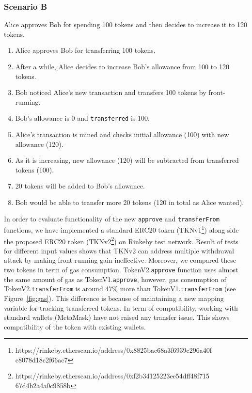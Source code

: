 \subsubsection*{Scenario B} Alice approves Bob for spending 100 tokens and then decides to increase it to 120 tokens.
\begin{enumerate}
	\item Alice approves Bob for transferring 100 tokens.
	\item After a while, Alice decides to increase Bob’s allowance from 100 to 120 tokens.
	\item Bob noticed Alice’s new transaction and transfers 100 tokens by front-running.
	\item Bob’s allowance is 0 and \texttt{transferred} is 100.
	\item Alice’s transaction is mined and checks initial allowance (100) with new allowance (120).
	\item As it is increasing, new allowance (120) will be subtracted from transferred tokens (100).
	\item 20 tokens will be added to Bob’s allowance.
	\item Bob would be able to transfer more 20 tokens (120 in total as Alice wanted).\newline
\end{enumerate}

In order to evaluate functionality of the new \texttt{approve} and \texttt{transferFrom} functions, we have implemented a standard ERC20 token (TKNv1\footnote{https://rinkeby.etherscan.io/address/0x8825bac68a3f6939c296a40f c8078d18c2f66ac7}) along side the proposed ERC20 token (TKNv2\footnote{https://rinkeby.etherscan.io/address/0xf2b34125223ee54dff48f715 67d4b2a4a0c9858b}) on Rinkeby test network. Result of tests for different input values shows that TKNv2 can address multiple withdrawal attack by making front-running gain ineffective. Moreover, we compared these two tokens in term of gas consumption. TokenV2.\texttt{approve} function uses almost the same amount of gas as TokenV1.\texttt{approve}, however, gas consumption of TokenV2.\texttt{transferFrom} is around 47\% more than TokenV1.\texttt{transferFrom} (see Figure~\ref{fig:gas}). This difference is because of maintaining a new mapping variable for tracking transferred tokens. In term of compatibility, working with standard wallets (\eg MetaMask) have not raised any transfer issue. This shows compatibility of the token with existing wallets.

